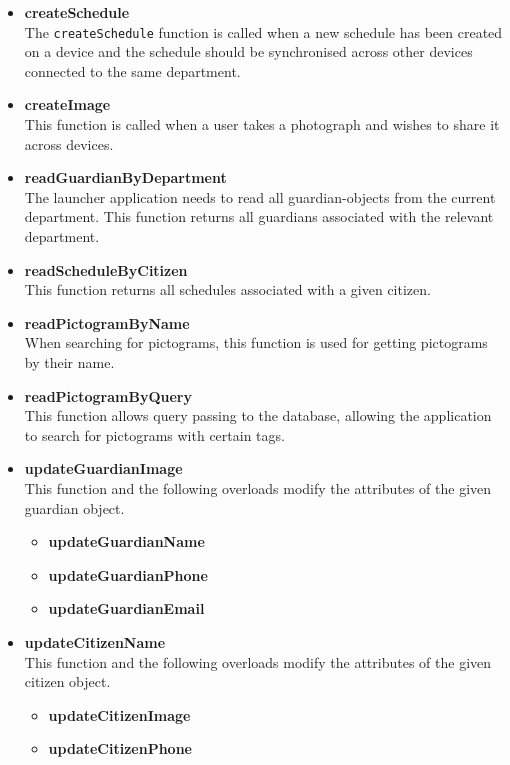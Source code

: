 \begin{itemize}
    \item \textbf{createSchedule}\\
    The \texttt{createSchedule} function is called when a new schedule has been created on a device and the schedule should be synchronised across other devices connected to the same department.
    \item \textbf{createImage}\\
    This function is called when a user takes a photograph and wishes to share it across devices.
    \item \textbf{readGuardianByDepartment}\\
    The launcher application needs to read all guardian-objects from the current department. This function returns all guardians associated with the relevant department.
    \item \textbf{readScheduleByCitizen}\\
    This function returns all schedules associated with a given citizen.
    \item \textbf{readPictogramByName}\\
    When searching for pictograms, this function is used for getting pictograms by their name.
    \item \textbf{readPictogramByQuery}\\
    This function allows query passing to the database, allowing the application to search for pictograms with certain tags.
    \item \textbf{updateGuardianImage}\\
    This function and the following overloads modify the attributes of the given guardian object.
    \begin{itemize}
        \item \textbf{updateGuardianName}
        \item \textbf{updateGuardianPhone}
        \item \textbf{updateGuardianEmail}
    \end{itemize}
    \item \textbf{updateCitizenName}\\
    This function and the following overloads modify the attributes of the given citizen object.
    \begin{itemize}
        \item \textbf{updateCitizenImage}
        \item \textbf{updateCitizenPhone}

\end{itemize}
\end{itemize}

